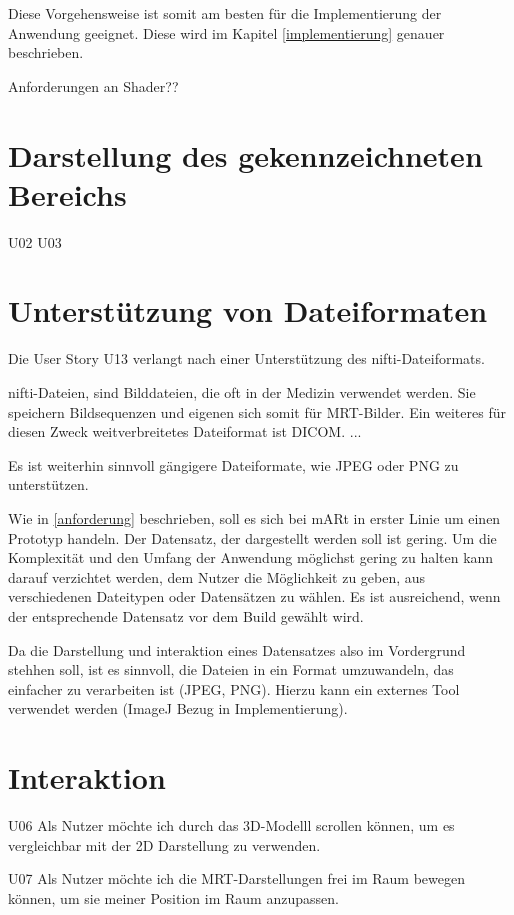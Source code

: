 Diese Vorgehensweise ist somit am besten für die Implementierung der Anwendung geeignet.
Diese wird im Kapitel \ref{implementierung} genauer beschrieben.

Anforderungen an Shader??


\section{Darstellung des gekennzeichneten Bereichs}


U02 U03  

\section{Unterstützung von Dateiformaten} 

Die User Story U13 verlangt nach einer Unterstützung des nifti-Dateiformats.

nifti-Dateien, sind Bilddateien, die oft in der Medizin verwendet werden. Sie speichern Bildsequenzen und eigenen sich somit für MRT-Bilder. 
Ein weiteres für diesen Zweck weitverbreitetes Dateiformat ist DICOM. ...

Es ist weiterhin sinnvoll gängigere Dateiformate, wie JPEG oder PNG zu unterstützen. 

Wie in \ref{anforderung} beschrieben, soll es sich bei mARt in erster Linie um einen Prototyp handeln. 
Der Datensatz, der dargestellt werden soll ist gering. Um die Komplexität und den Umfang der Anwendung möglichst gering zu halten kann darauf verzichtet werden, dem Nutzer die Möglichkeit zu geben, aus verschiedenen Dateitypen oder Datensätzen zu wählen. Es ist ausreichend, wenn der entsprechende Datensatz vor dem Build gewählt wird.

Da die Darstellung und interaktion eines Datensatzes also im Vordergrund stehhen soll, ist es sinnvoll, die Dateien in ein Format umzuwandeln, das einfacher zu verarbeiten ist (JPEG, PNG). Hierzu kann ein externes Tool verwendet werden (ImageJ Bezug in Implementierung).


\section{Interaktion} 


U06  Als Nutzer möchte ich durch das 3D-Modelll scrollen können, um es vergleichbar mit der 2D Darstellung zu verwenden.

U07  Als Nutzer möchte ich die MRT-Darstellungen frei im Raum bewegen können, um sie meiner Position im Raum anzupassen.

